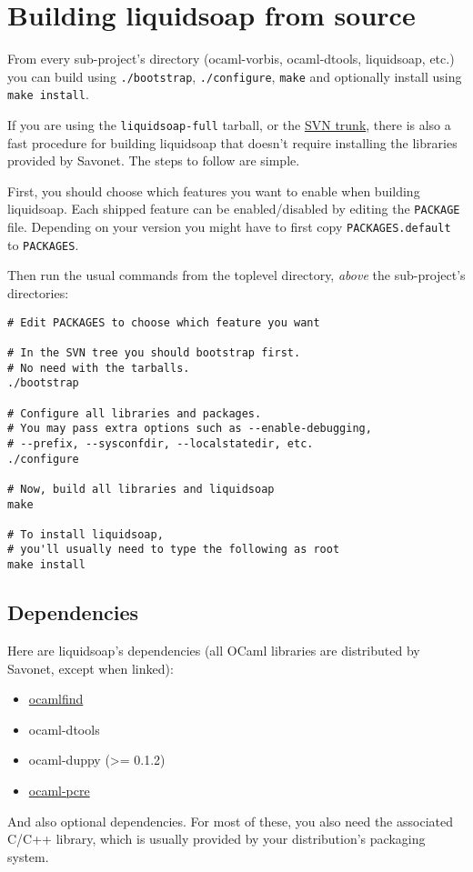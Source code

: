 \section{Building liquidsoap from source}
From every sub-project's directory (ocaml-vorbis, ocaml-dtools, liquidsoap, 
etc.) you can build using \verb+./bootstrap+, \verb+./configure+, 
\verb+make+ and optionally install using \verb+make install+.

If you are using the \verb+liquidsoap-full+ tarball,
or the
\href{https://savonet.svn.sourceforge.net/svnroot/savonet/trunk}{SVN trunk},
there is also a fast procedure for building liquidsoap
that doesn't require installing the libraries provided by Savonet.
The steps to follow are simple.

First,
you should choose which features you want to enable when building liquidsoap.
Each shipped feature can be enabled/disabled by editing the
\verb+PACKAGE+ file.
Depending on your version you might have to first copy 
\verb+PACKAGES.default+ to \verb+PACKAGES+.

Then run the usual commands from the toplevel directory, \emph{above} the
sub-project's directories:

\begin{verbatim}
# Edit PACKAGES to choose which feature you want

# In the SVN tree you should bootstrap first.
# No need with the tarballs.
./bootstrap

# Configure all libraries and packages.
# You may pass extra options such as --enable-debugging,
# --prefix, --sysconfdir, --localstatedir, etc.
./configure

# Now, build all libraries and liquidsoap
make

# To install liquidsoap,
# you'll usually need to type the following as root
make install
\end{verbatim}
\subsection{Dependencies}
Here are liquidsoap's dependencies (all OCaml libraries are distributed by Savonet, except when linked):

\begin{itemize}
\item \href{http://www.ocaml-programming.de/programming/findlib.html}{ocamlfind}
\item ocaml-dtools
\item ocaml-duppy (>= 0.1.2)
\item \href{http://www.ocaml.info/home/ocaml_sources.html}{ocaml-pcre}

\end{itemize}
And also optional dependencies. For most of these, you also need
the associated C/C++ library, which is usually provided by your distribution's
packaging system.

